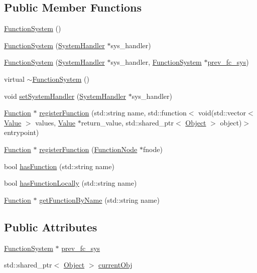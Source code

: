\subsection*{Public Member Functions}
\begin{DoxyCompactItemize}
\item 
\hyperlink{classFunctionSystem_a66e3b5e5118f00a940c3e4a2f138c9c6}{Function\+System} ()
\item 
\hyperlink{classFunctionSystem_a8c2420b3c21af6e84bdf0ef23ccdb0a6}{Function\+System} (\hyperlink{classSystemHandler}{System\+Handler} $\ast$sys\+\_\+handler)
\item 
\hyperlink{classFunctionSystem_aa847d30455d0868179326505ec6384cd}{Function\+System} (\hyperlink{classSystemHandler}{System\+Handler} $\ast$sys\+\_\+handler, \hyperlink{classFunctionSystem}{Function\+System} $\ast$\hyperlink{classFunctionSystem_a0d223ca42b6d6617af61136bdb1f33dd}{prev\+\_\+fc\+\_\+sys})
\item 
virtual \hyperlink{classFunctionSystem_ad6f794406996091d08df65e8d3e0e665}{$\sim$\+Function\+System} ()
\item 
void \hyperlink{classFunctionSystem_a7924e14b5794c595167aa9d547182883}{set\+System\+Handler} (\hyperlink{classSystemHandler}{System\+Handler} $\ast$sys\+\_\+handler)
\item 
\hyperlink{classFunction}{Function} $\ast$ \hyperlink{classFunctionSystem_a975b09fef826151dd66dece595aa452b}{register\+Function} (std\+::string name, std\+::function$<$ void(std\+::vector$<$ \hyperlink{classValue}{Value} $>$ values, \hyperlink{classValue}{Value} $\ast$return\+\_\+value, std\+::shared\+\_\+ptr$<$ \hyperlink{classObject}{Object} $>$ object)$>$ entrypoint)
\item 
\hyperlink{classFunction}{Function} $\ast$ \hyperlink{classFunctionSystem_a1a3d54c912c91ea7656cc5a6185a9a6f}{register\+Function} (\hyperlink{classFunctionNode}{Function\+Node} $\ast$fnode)
\item 
bool \hyperlink{classFunctionSystem_a7248f494dea505ffaa2108b202f1efcb}{has\+Function} (std\+::string name)
\item 
bool \hyperlink{classFunctionSystem_a5bb3f64848489ff7cc4c982c08a10eaa}{has\+Function\+Locally} (std\+::string name)
\item 
\hyperlink{classFunction}{Function} $\ast$ \hyperlink{classFunctionSystem_a6ccd76d0760272b64790d6f5c8cdc607}{get\+Function\+By\+Name} (std\+::string name)
\end{DoxyCompactItemize}
\subsection*{Public Attributes}
\begin{DoxyCompactItemize}
\item 
\hyperlink{classFunctionSystem}{Function\+System} $\ast$ \hyperlink{classFunctionSystem_a0d223ca42b6d6617af61136bdb1f33dd}{prev\+\_\+fc\+\_\+sys}
\item 
std\+::shared\+\_\+ptr$<$ \hyperlink{classObject}{Object} $>$ \hyperlink{classFunctionSystem_a59f2a49d91338ced0a79d3898412fcaf}{current\+Obj}
\end{DoxyCompactItemize}


